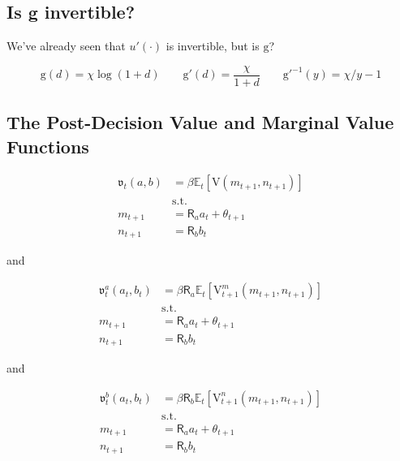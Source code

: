 \documentclass{article}
\newcommand{\DiscFac}{\beta}
\newcommand{\VFunc}{\mathrm{V}}
\newcommand{\util}{u}
\newcommand{\tShkEmp}{\theta}
\newcommand{\Ex}{\mathbb{E}}
\newcommand{\bRat}{b}
\newcommand{\Rfree}{\mathsf{R}}
\newcommand{\aRat}{a}
\newcommand{\mRat}{m}
\newcommand{\vEnd}{\mathfrak{v}}
\newcommand{\nRat}{n}
\newcommand{\dRat}{d}
\newcommand{\gFunc}{\mathrm{g}}
\newcommand{\xFer}{\chi}
\begin{document}
\subsection{Is g invertible?}\label{Is g invertible?}

We've already seen that $\util'(\cdot)$ is invertible, but is $\gFunc$?

\begin{equation}
\gFunc(\dRat) = \xFer \log(1+\dRat) \qquad \gFunc'(\dRat) =
    \frac{\xFer}{1+\dRat} \qquad \gFunc'^{-1}(y) = \xFer/y - 1
\end{equation}

\subsection{The Post-Decision Value and Marginal Value Functions}\label{The Post-Decision Value and Marginal Value Functions}

\begin{equation}
\begin{split}
        \vEnd_{t}(\aRat, \bRat) & =  \DiscFac \Ex_{t} \left[
            \VFunc(\mRat_{t+1}, \nRat_{t+1}) \right] \\
        & \text{s.t.} \\
        \mRat_{t+1} & = \Rfree_{\aRat} \aRat_{t} + \tShkEmp_{t+1} \\
        \nRat_{t+1} & = \Rfree_{\bRat} \bRat_{t}
    \end{split}
\end{equation}

and

\begin{equation}
\begin{split}
        \vEnd_{t}^{\aRat}(\aRat_{t}, \bRat_{t}) & =  \DiscFac
        \Rfree_{\aRat} \Ex_{t} \left[ \VFunc^{\mRat}_{t+1}(\mRat_{t+1},
            \nRat_{t+1})
            \right] \\
        & \text{s.t.} \\
        \mRat_{t+1} & = \Rfree_{\aRat} \aRat_{t} + \tShkEmp_{t+1} \\
        \nRat_{t+1} & = \Rfree_{\bRat} \bRat_{t}
    \end{split}
\end{equation}

and

\begin{equation}
\begin{split}
        \vEnd_{t}^{\bRat}(\aRat_{t}, \bRat_{t}) & =  \DiscFac
        \Rfree_{\bRat} \Ex_{t} \left[ \VFunc^{\nRat}_{t+1}(\mRat_{t+1},
            \nRat_{t+1})
            \right] \\
        & \text{s.t.} \\
        \mRat_{t+1} & = \Rfree_{\aRat} \aRat_{t} + \tShkEmp_{t+1} \\
        \nRat_{t+1} & = \Rfree_{\bRat} \bRat_{t}
    \end{split}
\end{equation}
\end{document}

